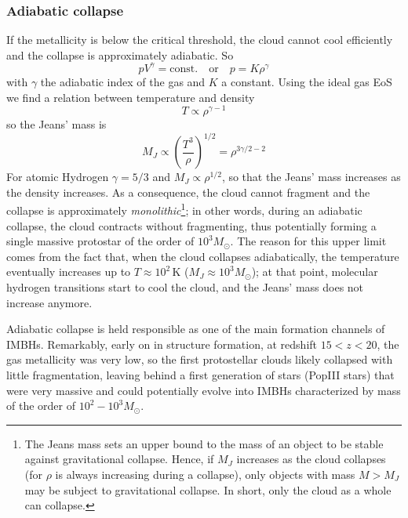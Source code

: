\subsubsection*{Adiabatic collapse}
If the metallicity is below the critical threshold, the cloud cannot cool efficiently and the collapse is approximately adiabatic. So 
\begin{equation}
    pV^{\gamma} = \text{const.} \quad \text{or}\quad  p = K\rho^{\gamma}
    \label{eq:adiabatic_relation}
\end{equation}
with $\gamma$ the adiabatic index of the gas and $K$ a constant. Using the ideal gas EoS we find a relation between temperature and density
\begin{equation*}
    T \propto \rho^{\gamma-1}
\end{equation*}
so the Jeans' mass is 
\begin{equation*}
    M_{J} \propto \left(\frac{T^{3}}{\rho}\right)^{1/2}= \rho^{3\gamma/2-2}
\end{equation*}
For atomic Hydrogen $\gamma = 5/3$ and $M_{J}\propto \rho^{1/2}$, so that the Jeans' mass increases as the density increases. As a consequence, the cloud cannot fragment and the collapse is approximately \emph{monolithic}\footnote{The Jeans mass sets an upper bound to the mass of an object to be stable against gravitational collapse. Hence, if $M_{J}$ increases as the cloud collapses (for $\rho$ is always increasing during a collapse), only objects with mass $M>M_{J}$ may be subject to gravitational collapse. In short, only the cloud as a whole can collapse.}; in other words, during an adiabatic collapse, the cloud contracts without fragmenting,  thus potentially forming a single massive protostar of the order of $10^{3}M_{\odot}$. The reason for this upper limit comes from the fact that, when the cloud collapses adiabatically, the temperature eventually increases up to $T\approx 10^{2}\,\text{K}$ ($M_{J}\approx 10^{3}M_{\odot}$); at that point, molecular hydrogen transitions start to cool the cloud, and the Jeans' mass does not increase anymore.
\par Adiabatic collapse is held responsible as one of the main formation channels of IMBHs. Remarkably, early on in structure formation, at redshift $15 < z < 20$, the gas metallicity was very low, so the ﬁrst protostellar clouds likely collapsed with little fragmentation, leaving behind a ﬁrst generation of stars (PopIII stars) that were very massive and could potentially evolve into IMBHs characterized by mass of the order of $10^{2}-10^{3}M_{\odot}$.
